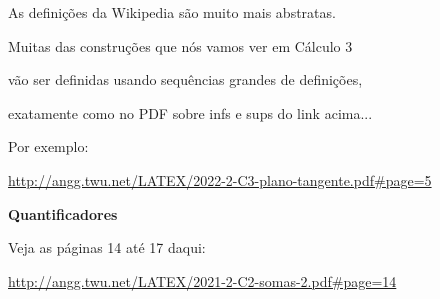 \documentclass[oneside,12pt]{article}
\begin{document}
\ssk

As definições da Wikipedia são muito mais abstratas.

\bsk

Muitas das construções que nós vamos ver em Cálculo 3

vão ser definidas usando sequências grandes de definições,

exatamente como no PDF sobre infs e sups do link acima...

Por exemplo:

\ssk

{\footnotesize

\url{http://angg.twu.net/LATEX/2022-2-C3-plano-tangente.pdf\#page=5}

}

\ssk





\newpage













\newpage


{\bf Quantificadores}

Veja as páginas 14 até 17 daqui:

\ssk

{\footnotesize

\url{http://angg.twu.net/LATEX/2021-2-C2-somas-2.pdf#page=14}

}
\end{document}
